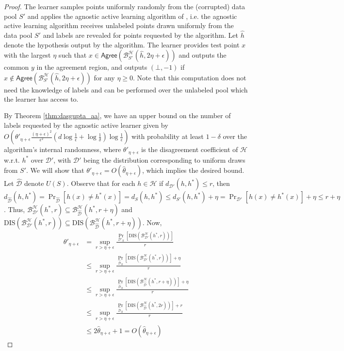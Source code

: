 \documentclass[11pt]{article}
\newcommand{\0}{\mathbf{0}}
\newcommand{\1}{\mathbf{1}}
\newcommand{\cB}{\mathcal{B}}
\newcommand{\cD}{\mathcal{D}}
\newcommand{\cH}{\mathcal{H}}
\newcommand{\Agree}{\mathsf{Agree}}
\begin{document}
\begin{proof} The learner samples points uniformly randomly from the (corrupted) data pool $S'$ and applies the agnostic active learning algorithm of \cite{dasgupta2007general}, i.e. the agnostic active learning algorithm receives unlabeled points drawn uniformly from the data pool $S'$ and labels are revealed for points requested by the algorithm. Let $\hat{h}$ denote the hypothesis output by the algorithm. The learner provides test point $x$ with the largest $\eta$ such that $x\in\Agree(\cB_{S'}^\cH(\hat{h},2\eta+\epsilon))$ and outputs the common $y$ in the agreement region, and outputs $(\bot,-1)$ if $x\notin\Agree(\cB_{S'}^\cH(\hat{h},2\eta+\epsilon))$ for any $\eta\ge 0$. Note that this computation does not need the knowledge of labels and can be performed over the unlabeled pool which the learner has access to.

By Theorem \ref{thm:dasgupta_aa}, we have an upper bound on the number of labels requested by the agnostic active learner given by $O\!\left( \theta'_{\eta+\epsilon} \frac{(\eta+\epsilon)^2}{\epsilon^2}\left( d \log\frac{1}{\epsilon}+\log\frac{1}{\delta} \right)\log\frac{1}{\epsilon}  \right)$ with probability at least $1-\delta$ over the algorithm's internal randomness, where $\theta'_{\eta+\epsilon}$ is the disagreement coefficient of $\cH$ w.r.t. $h^*$ over $\cD'$, with $\cD'$ being the distribution corresponding to uniform draws from $S'$. We will show that $\theta'_{\eta+\epsilon}=O(\hat{\theta}_{\eta+\epsilon})$, which implies the desired bound. Let $\hat{\cD}$ denote $U(S)$. Observe that for each $h\in\cH$ if $d_{\cD'}(h,h^*)\le r$, then $d_{\hat{\cD}}(h,h^*)=\Pr_{\hat{\cD}}[h(x)\ne h^*(x)]= d_S(h,h^*) \le d_{S'}(h,h^*)+\eta= \Pr_{\cD'}[h(x)\ne h^*(x)]+\eta\le r+\eta$.
Thus, $\cB_{\cD'}^{\cH}(h^*,r)\subseteq \cB_{\hat{\cD}}^{\cH}(h^*,r+\eta)$ and $\text{DIS}(\cB_{\cD'}^{\cH}(h^*,r))\subseteq \text{DIS}(\cB_{\hat{\cD}}^{\cH}(h^*,r+\eta))$.
Now,
\begin{align*}
    \theta'_{\eta+\epsilon}&=\sup_{r>\eta+ \epsilon}\frac{\Pr_{\cD'_X}
[\text{DIS}(\cB_{\cD'}^\cH(h^*, r))]}{r}
\\&\le \sup_{r>\eta+ \epsilon}\frac{\Pr_{\hat{\cD}_X}
[\text{DIS}(\cB_{\cD'}^\cH(h^*, r))]+\eta}{r}
\\&\le \sup_{r>\eta+ \epsilon}\frac{\Pr_{\hat{\cD}_X}
[\text{DIS}(\cB_{\hat{\cD}}^\cH(h^*,r+\eta))]+\eta}{r}
\\&\le \sup_{r>\eta+ \epsilon}\frac{\Pr_{\hat{\cD}_X}
[\text{DIS}(\cB_{\hat{\cD}}^\cH(h^*,2r))]+r}{r}
\\&\le 2\hat{\theta}_{\eta+\epsilon}+1= O(\hat{\theta}_{\eta+\epsilon})
\end{align*}


\end{proof}
\end{document}

